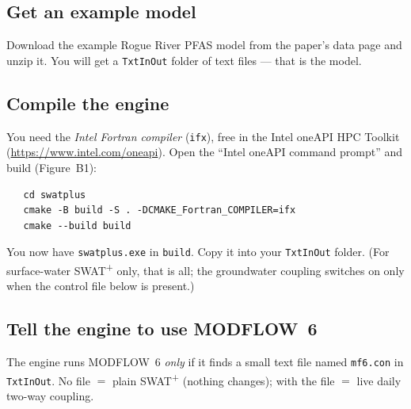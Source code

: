 \documentclass[12pt]{article}
\begin{document}
\subsection{Get an example model}
Download the example Rogue River PFAS model from the paper's data page and unzip
it. You will get a \texttt{TxtInOut} folder of text files --- that is the model.

\subsection{Compile the engine}
You need the \emph{Intel Fortran compiler} (\texttt{ifx}), free in the Intel
oneAPI HPC Toolkit (\url{https://www.intel.com/oneapi}). Open the ``Intel oneAPI
command prompt'' and build (Figure~B1):
\begin{verbatim}
   cd swatplus
   cmake -B build -S . -DCMAKE_Fortran_COMPILER=ifx
   cmake --build build
\end{verbatim}
You now have \texttt{swatplus.exe} in \texttt{build}. Copy it into your
\texttt{TxtInOut} folder. (For surface-water SWAT\textsuperscript{+} only, that is
all; the groundwater coupling switches on only when the control file below is
present.)

\subsection{Tell the engine to use MODFLOW~6}\label{g:mf6con}
The engine runs MODFLOW~6 \emph{only} if it finds a small text file named
\texttt{mf6.con} in \texttt{TxtInOut}. No file $=$ plain SWAT\textsuperscript{+}
(nothing changes); with the file $=$ live daily two-way coupling.
\end{document}
